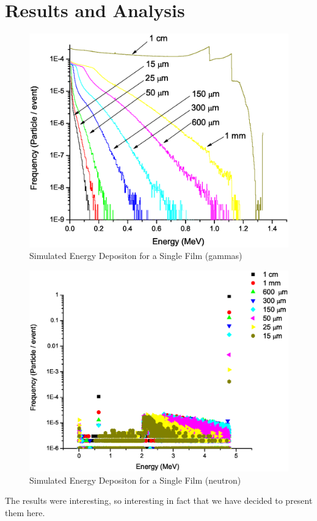 \documentclass{anstrans}
\begin{document}
\section{Results and Analysis}
\begin{figure}[h]
    \includegraphics[width=\textwidth]{PS_EDepSim_Co60}
	\caption{Simulated Energy Depositon for a Single Film (gammas)}
    \label{fig:SimEDepGamma}
\end{figure}
\begin{figure}[h]
    \includegraphics[width=\textwidth]{PS_EDepSim_Neutron}
	\caption{Simulated Energy Depositon for a Single Film (neutron)}
    \label{fig:SimEDepGamma}
\end{figure}
The results were interesting, so interesting in fact that we have decided to
present them here.
\end{document}
